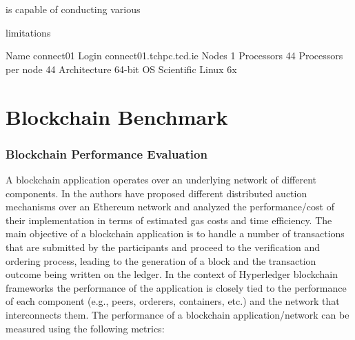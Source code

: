 is capable of conducting various 


limitations

\textbf{
}


Name
connect01
Login
connect01.tchpc.tcd.ie
Nodes
1
Processors
44
Processors per node
44
Architecture
64-bit
OS
Scientific Linux 6x

\section{Blockchain Benchmark}


\subsubsection{Blockchain Performance Evaluation}
A blockchain application operates over an underlying network of different components. In \cite{10.1007/978-3-030-16946-6_5,10.1007/978-3-662-58820-8_18} the authors have proposed different distributed auction mechanisms over an Ethereum network and analyzed the performance/cost of their implementation in terms of estimated gas costs and time efficiency. 
The main objective of a blockchain application is to handle a number of transactions that are submitted by the participants and proceed to the verification and ordering process, leading to the generation of a block and the transaction outcome being written on the ledger.
In the context of Hyperledger blockchain frameworks the performance of the application is closely tied to the performance of each component (e.g., peers, orderers, containers, etc.) and the network that interconnects them. The performance of a blockchain application/network can be measured using the following metrics:


